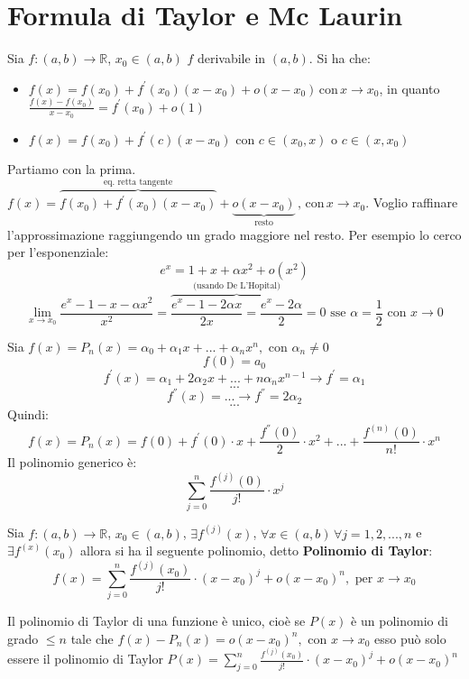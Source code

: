 \documentclass[a4paper,12pt, oneside]{book}
\begin{document}
\section{Formula di Taylor e Mc Laurin}
Sia $f:(a,b)\rightarrow\mathbb{R}$, $x_0\in (a,b)$ $f$ derivabile in $(a,b)$.
Si ha che:
\begin{itemize}
\item $f(x)=f(x_0)+f^{'}(x_0)(x-x_0)+o(x-x_0)\, \mbox{con} \, x\rightarrow x_0$, in quanto \\$\frac{f(x)-f(x_0)}{x-x_0}=f^{'}(x_0)+o(1)$
\item $f(x)=f(x_0)+f^{'}(c)(x-x_0)\mbox{ con } c\in(x_0,x) \mbox{ o } c\in (x,x_0)$
\end{itemize} 
Partiamo con la prima.
$f(x)=\overbrace{f(x_0)+f^{'}(x_0)(x-x_0)}^{\mbox{eq. retta tangente}}+\underbrace{o(x-x_0)}_{\mbox{resto}}\, \mbox{, con} \, x\rightarrow x_0$. Voglio raffinare l'approssimazione raggiungendo un grado maggiore nel resto.
Per esempio lo cerco per l'esponenziale:
$$e^x=1+x+\alpha x^2+o(x^2)$$ $$\lim_{x\rightarrow x_0} \frac{e^x-1-x-\alpha x^2}{x^2}=\overbrace{\frac{e^x-1-2 \alpha x}{2x}=\frac{e^x-2 \alpha}{2}}^{\mbox{ (usando De L'Hopital) }}=0 \mbox{ sse }\alpha=\frac{1}{2}\mbox{ con } x\rightarrow 0$$
\newpage
\begin{osservazione}
Sia $f(x)=P_n(x)=\alpha_0+\alpha_1 x+...+\alpha_n x^n, \mbox{ con } \alpha_n\neq 0$
$$f(0)=a_0$$
$$f^{'}(x)=\alpha_1+2 \alpha_2 x+...+n \alpha_n x^{n-1}\rightarrow f^{'}=\alpha_1$$
$$...$$
$$ f^{''}(x)=...\rightarrow f^{''}=2\alpha_2$$
$$...$$
Quindi:
$$f(x)=P_n(x)=f(0)+f^{'}(0)\cdot x+\frac{f^{''}(0)}{2}\cdot x^2+...+\frac{f^{(n)}(0)}{n!}\cdot x^n$$
Il polinomio generico è:
$$\sum_{j=0}^{n} \frac{f^{(j)}(0)}{j!}\cdot x^j$$

\end{osservazione}
\begin{teorema}
Sia $f:(a,b)\rightarrow\mathbb{R}$, $x_0\in (a,b)$, $\exists f^{(j)}(x)$, $\forall x\in (a,b)\, \forall j=1,2,...,n$ e $\exists f^{(x)}(x_0)$ allora si ha il seguente polinomio, detto \textbf{Polinomio di Taylor}:
$$f(x)=\sum_{j=0}^{n} \frac{f^{(j)}(x_0)}{j!}\cdot {(x-x_0)}^j+o(x-x_0)^n, \mbox{ per } x\rightarrow x_0$$
\end{teorema}
\begin{osservazione}
Il polinomio di Taylor di una funzione è unico, cioè se $P(x)$ è un polinomio di grado $\leq n$ tale che $f(x)-P_n(x)=o(x-x_0)^n, \mbox{ con } x\rightarrow x_0$ esso può solo essere il polinomio di Taylor $P(x)=\sum_{j=0}^{n} \frac{f^{(j)}(x_0)}{j!}\cdot {(x-x_0)}^j+o(x-x_0)^n$
\end{osservazione}
\end{document}
